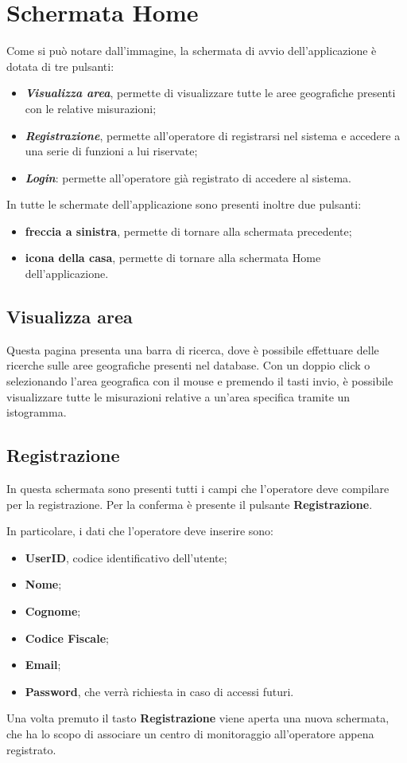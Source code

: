 \section{Schermata Home}
Come si può notare dall'immagine, la schermata di avvio dell'applicazione è dotata di tre pulsanti:
\begin{itemize}
	\item \textbf{\textit{Visualizza area}}, permette di visualizzare tutte le aree geografiche presenti con le relative misurazioni;
	\item \textbf{\textit{Registrazione}}, permette all'operatore di registrarsi nel sistema e accedere a una serie di funzioni a lui riservate;
	\item \textbf{\textit{Login}}: permette all'operatore già registrato di accedere al sistema. 
\end{itemize}
In tutte le schermate dell'applicazione sono presenti inoltre due pulsanti:
\begin{itemize}
	\item \textbf{freccia a sinistra}, permette di tornare alla schermata precedente;
	\item \textbf{icona della casa}, permette di tornare alla schermata Home dell'applicazione.
\end{itemize}
\subsection{Visualizza area}\label{VisualizzaArea}
Questa pagina presenta una barra di ricerca, dove è possibile effettuare delle ricerche sulle aree geografiche presenti nel database.
Con un doppio click o selezionando l'area geografica con il mouse e premendo il tasti invio, è possibile visualizzare tutte le misurazioni relative a un'area specifica tramite un istogramma.

\subsection{Registrazione}
In questa schermata sono presenti tutti i campi che l'operatore deve compilare per la registrazione. Per la conferma è presente il pulsante \textbf{Registrazione}.

In particolare, i dati che l'operatore deve inserire sono:
\begin{itemize}
	\item  \textbf{UserID}, codice identificativo dell'utente;
	\item  \textbf{Nome};
	\item  \textbf{Cognome};
	\item  \textbf{Codice Fiscale};
	\item  \textbf{Email};
	\item  \textbf{Password}, che verrà richiesta in caso di accessi futuri.
\end{itemize}
Una volta premuto il tasto \textbf{Registrazione} viene aperta una nuova schermata, che ha lo scopo di associare un centro di monitoraggio all'operatore appena registrato.

